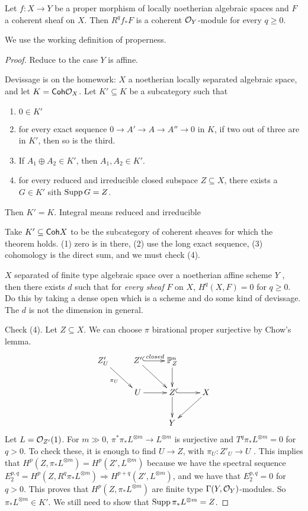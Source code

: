  \begin{theorem}
   Let $f:X\to Y$ be a proper morphism of locally noetherian algebraic spaces and $F$ a
   coherent sheaf on $X$. Then $R^q\!f_*F$ is a coherent $\mathcal{O}_Y$-module for every $q\ge
   0$.
 \end{theorem}
 We use the working definition of properness.
 \begin{proof}
   Reduce to the case $Y$ is affine.

   Devissage is on the homework: $X$ a noetherian locally separated algebraic space, and
   let $K=\text{\sf Coh} \mathcal{O}_X$. Let $K'\subseteq K$ be a subcategory such that
   \begin{enumerate}
     \item $0\in K'$
     \item for every exact sequence $0\to A'\to A\to A''\to 0$ in $K$, if two out of
     three are in $K'$, then so is the third.
     \item If $A_1\oplus A_2\in K'$, then $A_1,A_2\in K'$.
     \item for every reduced and irreducible closed subspace $Z\subseteq X$, there exists a $G\in K'$
     sith $\operatorname{Supp} G=Z$.
   \end{enumerate}
   Then $K'=K$. Integral means reduced and irreducible 

   Take $K'\subseteq \text{\sf Coh} X$ to be the subcategory of coherent sheaves for which the
   theorem holds. (1) zero is in there, (2) use the long exact sequence, (3) cohomology
   is the direct sum, and we must check (4).
   \begin{remark}
      $X$ separated of finite type
     algebraic space over a noetherian affine scheme $Y$ , then there exists $d$ such that for \emph{every sheaf} $F$ on $X$,
     $H^q(X,F)=0$ for $q\ge 0$. Do this by taking a dense open which is a scheme and do
     some kind of devissage. The $d$ is not the dimension in general.
   \end{remark}

   Check (4). Let $Z\subseteq X$. We can choose $\pi$ birational proper surjective by
   Chow's lemma.
   \[\xymatrix{
    Z'_U\ar[dr]_{\pi_U}& Z'\ar@{^(->}[r]^{closed} \ar[dr] & \PP^n_Z\ar[d]\\
    &U\ar[r] & Z \ar@{^(->}[r]\ar[d] & X \ar[dl]\\
    & &Y
   }\]
    Let $L=\mathcal{O}_{Z'}(1)$. For $m \gg 0$, $\pi^*\pi_*L^{\otimes m}\to L^{\otimes m}$ is
   surjective  and $T^q\pi_*L^{\otimes m}=0$ for $q>0$. To check these, it is enough to
   find $U\to Z$, with $\pi_U:Z'_U\to U$ . This implies that
   $H^p(Z,\pi_*L^{\otimes m})=H^p(Z',L^{\otimes m})$ because we have the spectral
   sequence $E^{p,q}_2=H^p(Z,R^q\pi_*L^{\otimes m})\Rightarrow H^{p+q}(Z',L^{\otimes
   m})$, and we have that $E^{p,q}_2=0$ for $q>0$. This proves that
   $H^p(Z,\pi_*L^{\otimes m})$ are finite type $\Gamma(Y,\mathcal{O}_Y)$-modules. So $\pi_*L^{\otimes
   m}\in K'$. We still need to show that $\operatorname{Supp} \pi_*L^{\otimes m}=Z$.


\end{proof}
